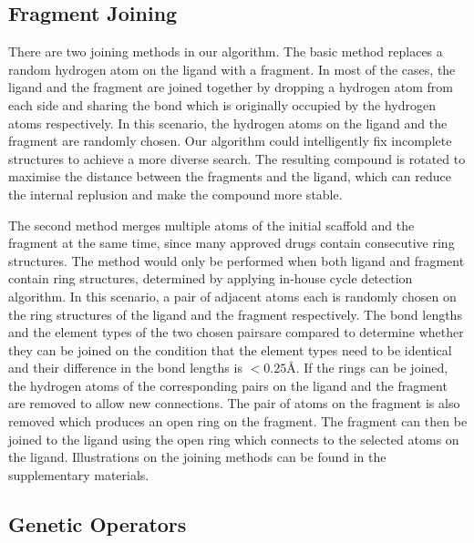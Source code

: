 \documentclass[10pt,conference,letterpaper]{IEEEtran}
\begin{document}
\subsection{Fragment Joining}
\label{subsec: fragment joining}
There are two joining methods in our algorithm.
The basic method replaces a random hydrogen atom on the ligand with a fragment.
In most of the cases, the ligand and the fragment are joined together by dropping a hydrogen atom from each side and sharing the bond which is originally occupied by the hydrogen atoms respectively.
In this scenario, the hydrogen atoms on the ligand and the fragment are randomly chosen.
Our algorithm could intelligently fix incomplete structures to achieve a more diverse search.
The resulting compound is rotated to maximise the distance between the fragments and the ligand, which can reduce the internal replusion and make the compound more stable.

The second method merges multiple atoms of the initial scaffold and the fragment at the same time,
since many approved drugs contain consecutive ring structures.
The method would only be performed when both ligand and fragment contain ring structures, determined by applying in-house cycle detection algorithm.
In this scenario, a pair of adjacent atoms each is randomly chosen on the ring structures of the ligand and the fragment respectively.
The bond lengths and the element types of the two chosen pairsare compared to determine whether they can be joined on the condition that the element types need to be identical and their difference in the bond lengths is $<0.25$\AA.
If the rings can be joined, the hydrogen atoms of the corresponding pairs on the ligand and the fragment are removed to allow new connections.
The pair of atoms on the fragment is also removed which produces an open ring on the fragment.
The fragment can then be joined to the ligand using the open ring which connects to the selected atoms on the ligand.
Illustrations on the joining methods can be found in the supplementary materials.

\subsection{Genetic Operators}
\label{subsec: genetric operators}
\end{document}
